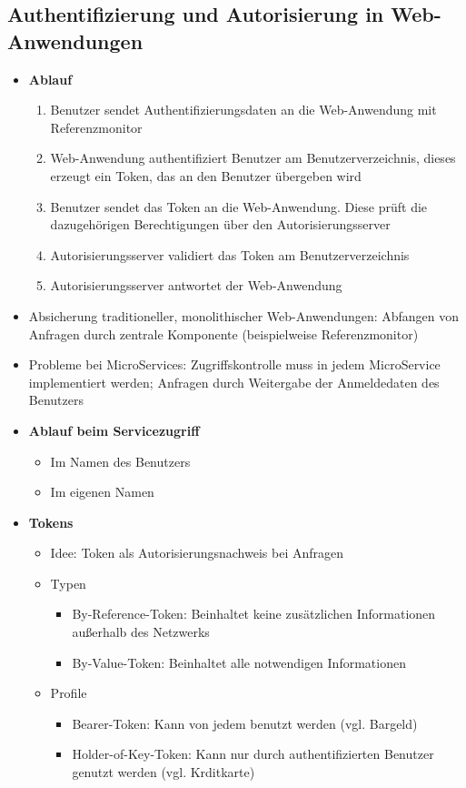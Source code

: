 \subsection{Authentifizierung und Autorisierung in Web-Anwendungen}
\begin{itemize}
	\item \textbf{Ablauf}
	\begin{enumerate}
		\item Benutzer sendet Authentifizierungsdaten an die Web-Anwendung mit Referenzmonitor
		\item Web-Anwendung authentifiziert Benutzer am Benutzerverzeichnis, dieses erzeugt ein Token, das an den Benutzer übergeben wird
		\item Benutzer sendet das Token an die Web-Anwendung. Diese prüft die dazugehörigen Berechtigungen über den Autorisierungsserver
		\item Autorisierungsserver validiert das Token am Benutzerverzeichnis
		\item Autorisierungsserver antwortet der Web-Anwendung
	\end{enumerate}
	\item Absicherung traditioneller, monolithischer Web-Anwendungen: Abfangen von Anfragen durch zentrale Komponente (beispielweise Referenzmonitor)
	\item Probleme bei MicroServices: Zugriffskontrolle muss in jedem MicroService implementiert werden; Anfragen durch Weitergabe der Anmeldedaten des Benutzers
	\item \textbf{Ablauf beim Servicezugriff}
	\begin{itemize}
		\item Im Namen des Benutzers
		\item Im eigenen Namen
	\end{itemize}
	\item \textbf{Tokens}
	\begin{itemize}
		\item Idee: Token als Autorisierungsnachweis bei Anfragen
		\item Typen
		\begin{itemize}
			\item By-Reference-Token: Beinhaltet keine zusätzlichen Informationen außerhalb des Netzwerks
			\item By-Value-Token: Beinhaltet alle notwendigen Informationen
		\end{itemize}
		\item Profile
		\begin{itemize}
			\item Bearer-Token: Kann von jedem benutzt werden (vgl. Bargeld)
			\item Holder-of-Key-Token: Kann nur durch authentifizierten Benutzer genutzt werden (vgl. Krditkarte)
		\end{itemize}
	\end{itemize}
\end{itemize}


